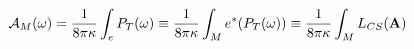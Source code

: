 \begin{equation}
{\cal A}_{M}(\omega )=\frac{1}{8\pi\kappa }\int_{e}P_{T}(\omega
)\equiv \frac{1}{8\pi\kappa }\int_{M}e^{*}(P_{T}(\omega ))\equiv
\frac{1}{8\pi\kappa } \int_{M}L_{CS}({\bf A})  \label{eqn:08}
\end{equation}

